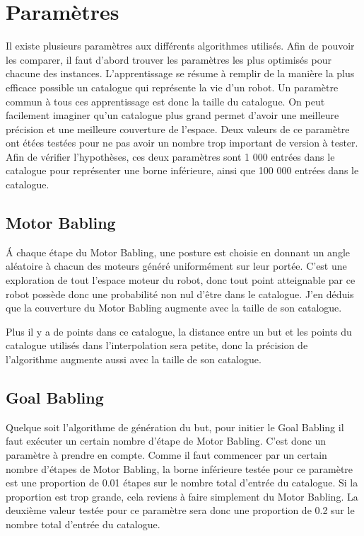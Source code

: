 \documentclass[11pt,french]{report}
\begin{document}
\section{Paramètres}

Il existe plusieurs paramètres aux différents algorithmes utilisés. Afin de pouvoir les comparer, il faut d'abord trouver les paramètres les plus optimisés pour chacune des instances. L'apprentissage se résume à remplir de la manière la plus efficace possible un catalogue qui représente la vie d'un robot. Un paramètre commun à tous ces apprentissage est donc la taille du catalogue. On peut facilement imaginer qu'un catalogue plus grand permet d'avoir une meilleure précision et une meilleure couverture de l'espace. Deux valeurs de ce paramètre ont étées testées pour ne pas avoir un nombre trop important de version à tester. Afin de vérifier l'hypothèses, ces deux paramètres sont 1 000 entrées dans le catalogue pour représenter une borne inférieure, ainsi que 100 000 entrées dans le catalogue.

\subsection{Motor Babling}

\'A chaque étape du Motor Babling, une posture est choisie en donnant un angle aléatoire à chacun des moteurs généré uniformément sur leur portée. C'est une exploration de tout l'espace moteur du robot, donc tout point atteignable par ce robot possède donc une probabilité non nul d'être dans le catalogue. J'en déduis que la couverture du Motor Babling augmente avec la taille de son catalogue.

Plus il y a de points dans ce catalogue, la distance entre un but et les points du catalogue utilisés dans l'interpolation sera petite, donc la précision de l'algorithme augmente aussi avec la taille de son catalogue.

\subsection{Goal Babling}

Quelque soit l'algorithme de génération du but, pour initier le Goal Babling il faut exécuter un certain nombre d'étape de Motor Babling. C'est donc un paramètre à prendre en compte. Comme il faut commencer par un certain nombre d'étapes de Motor Babling, la borne inférieure testée pour ce paramètre est une proportion de 0.01 étapes sur le nombre total d'entrée du catalogue. Si la proportion est trop grande, cela reviens à faire simplement du Motor Babling. La deuxième valeur testée pour ce paramètre sera donc une proportion de 0.2 sur le nombre total d'entrée du catalogue.
\end{document}
